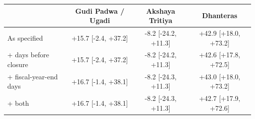 \begin{tabular}{lccc}
\toprule
 & Gudi Padwa / Ugadi & Akshaya Tritiya & Dhanteras \\
\midrule
As specified & +15.7 [-2.4, +37.2] & -8.2 [-24.2, +11.3] & +42.9 [+18.0, +73.2] \\
+ days before closure & +15.7 [-2.4, +37.2] & -8.2 [-24.2, +11.3] & +42.6 [+17.8, +72.5] \\
+ fiscal-year-end days & +16.7 [-1.4, +38.1] & -8.2 [-24.3, +11.3] & +43.0 [+18.0, +73.2] \\
+ both & +16.7 [-1.4, +38.1] & -8.2 [-24.3, +11.3] & +42.7 [+17.9, +72.6] \\
\bottomrule
\end{tabular}
